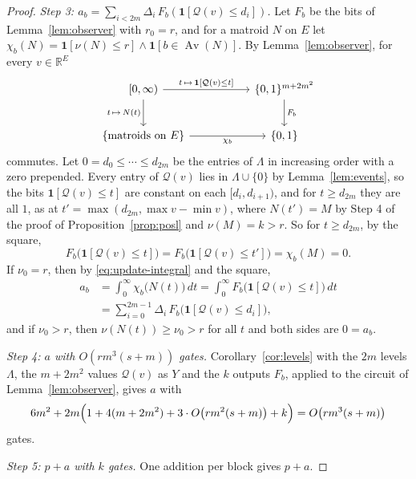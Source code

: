 \documentclass[11pt]{article}
\newcommand{\R}{\mathbb R}
\newcommand{\Av}{\operatorname{Av}}
\begin{document}
\begin{proof}
\emph{Step 3: $a_b=\sum_{i<2m}\Delta_i\,F_b(\mathbf 1[\mathcal Q(v)\le d_i])$.}  Let $F_b$ be the bits of
Lemma~\ref{lem:observer} with $r_0=r$, and for a matroid $N$ on $E$ let
$\chi_b(N)=\mathbf 1[\nu(N)\le r]\wedge\mathbf 1[b\in\Av(N)]$.  By
Lemma~\ref{lem:observer}, for every $v\in\R^{E}$
\[
  \begin{tikzcd}[column sep=5.4em,row sep=2.4em]
    {[0,\infty)}\arrow[r,"{t\,\mapsto\,\mathbf 1[\mathcal Q(v)\le t]}"]
      \arrow[d,"{t\,\mapsto\,N(t)}"'] &
    \{0,1\}^{m+2m^{2}}\arrow[d,"F_b"]\\
    \{\text{matroids on }E\}\arrow[r,"\chi_b"'] & \{0,1\}
  \end{tikzcd}
\]
commutes.  Let $0=d_0\le\cdots\le d_{2m}$ be the entries of
$\Lambda$ in increasing order with a zero prepended.  Every entry of $\mathcal Q(v)$
lies in $\Lambda\cup\{0\}$ by Lemma~\ref{lem:events}, so the bits
$\mathbf 1[\mathcal Q(v)\le t]$ are constant on each $[d_i,d_{i+1})$, and for
$t\ge d_{2m}$ they are all $1$, as at $t'=\max(d_{2m},\max v-\min v)$, where
$N(t')=M$ by Step 4 of the proof of Proposition~\ref{prop:posl} and $\nu(M)=k>r$.
So for $t\ge d_{2m}$, by the square,
\[
  F_b\bigl(\mathbf 1[\mathcal Q(v)\le t]\bigr)=F_b\bigl(\mathbf 1[\mathcal Q(v)\le t']\bigr)
  =\chi_b(M)=0.
\]
If $\nu_0=r$, then by \eqref{eq:update-integral} and the square,
\[
  \begin{aligned}
  a_b&=\int_0^{\infty}\chi_b\bigl(N(t)\bigr)\,dt
  =\int_0^{\infty}F_b\bigl(\mathbf 1[\mathcal Q(v)\le t]\bigr)\,dt\\
  &=\sum_{i=0}^{2m-1}\Delta_i\,F_b\bigl(\mathbf 1[\mathcal Q(v)\le d_i]\bigr),
  \end{aligned}
\]
and if $\nu_0>r$, then $\nu(N(t))\ge\nu_0>r$ for all $t$ and both sides are
$0=a_b$.

\emph{Step 4: $a$ with $O(rm^{3}(s+m))$ gates.}  Corollary~\ref{cor:levels} with the $2m$
levels $\Lambda$, the $m+2m^{2}$ values $\mathcal Q(v)$ as $Y$ and the $k$ outputs
$F_b$, applied to the circuit of Lemma~\ref{lem:observer}, gives $a$ with
\[
  6m^{2}+2m\Bigl(1+4(m+2m^{2})+3\cdot O\bigl(rm^{2}(s+m)\bigr)+k\Bigr)
  =O\bigl(rm^{3}(s+m)\bigr)
\]
gates.

\emph{Step 5: $p+a$ with $k$ gates.}  One addition per block gives $p+a$.
\end{proof}
\end{document}
